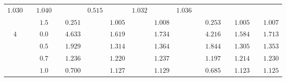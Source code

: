 \documentclass[twoside]{article}
\begin{document}
\begin{table}[h]
\begin{center}
\begin{tabular}{ | c | c c | c c c c c c | c c c c c c c | }
\multicolumn{1}{c}{$ 1.030 $} & 
\multicolumn{1}{c}{} & 
\multicolumn{1}{c}{$ 1.040 $} &
\multicolumn{2}{c}{} & 
\multicolumn{1}{c}{$ 0.515 $} &   
\multicolumn{1}{c}{} & 
\multicolumn{1}{c}{$ 1.032 $} & 
\multicolumn{1}{c}{} & 
\multicolumn{1}{c|}{$ 1.036 $} 
\\   
\multicolumn{1}{|c}{} & 
\multicolumn{1}{c}{} & 
\multicolumn{1}{c}{$ 1.5 $} & 
\multicolumn{1}{c}{} & 
\multicolumn{1}{c}{$ 0.251 $} &   
\multicolumn{1}{c}{} & 
\multicolumn{1}{c}{$ 1.005 $} & 
\multicolumn{1}{c}{} & 
\multicolumn{1}{c}{$ 1.008 $} &
\multicolumn{2}{c}{} & 
\multicolumn{1}{c}{$ 0.253 $} &   
\multicolumn{1}{c}{} & 
\multicolumn{1}{c}{$ 1.005 $} & 
\multicolumn{1}{c}{} & 
\multicolumn{1}{c|}{$ 1.007 $} 
\\   
\hline 
\multicolumn{1}{|c}{$ 4 $} & 
\multicolumn{1}{c}{} & 
\multicolumn{1}{c}{$ 0.0 $} & 
\multicolumn{1}{c}{} & 
\multicolumn{1}{c}{$ 4.633 $} &   
\multicolumn{1}{c}{} & 
\multicolumn{1}{c}{$ 1.619 $} & 
\multicolumn{1}{c}{} & 
\multicolumn{1}{c}{$ 1.734 $} &
\multicolumn{2}{c}{} & 
\multicolumn{1}{c}{$ 4.216 $} &   
\multicolumn{1}{c}{} & 
\multicolumn{1}{c}{$ 1.584 $} & 
\multicolumn{1}{c}{} & 
\multicolumn{1}{c|}{$ 1.713 $} 
\\  
\multicolumn{1}{|c}{} & 
\multicolumn{1}{c}{} & 
\multicolumn{1}{c}{$ 0.5 $} & 
\multicolumn{1}{c}{} & 
\multicolumn{1}{c}{$ 1.929 $} &   
\multicolumn{1}{c}{} & 
\multicolumn{1}{c}{$ 1.314 $} & 
\multicolumn{1}{c}{} & 
\multicolumn{1}{c}{$ 1.364 $} &
\multicolumn{2}{c}{} & 
\multicolumn{1}{c}{$ 1.844 $} &   
\multicolumn{1}{c}{} & 
\multicolumn{1}{c}{$ 1.305 $} & 
\multicolumn{1}{c}{} & 
\multicolumn{1}{c|}{$ 1.353 $} 
\\    
\multicolumn{1}{|c}{} & 
\multicolumn{1}{c}{} & 
\multicolumn{1}{c}{$ 0.7 $} & 
\multicolumn{1}{c}{} & 
\multicolumn{1}{c}{$ 1.236 $} &   
\multicolumn{1}{c}{} & 
\multicolumn{1}{c}{$ 1.220 $} & 
\multicolumn{1}{c}{} & 
\multicolumn{1}{c}{$ 1.237 $} &
\multicolumn{2}{c}{} & 
\multicolumn{1}{c}{$ 1.197 $} &   
\multicolumn{1}{c}{} & 
\multicolumn{1}{c}{$ 1.214 $} & 
\multicolumn{1}{c}{} & 
\multicolumn{1}{c|}{$ 1.230 $} 
\\  
\multicolumn{1}{|c}{} & 
\multicolumn{1}{c}{} & 
\multicolumn{1}{c}{$ 1.0 $} & 
\multicolumn{1}{c}{} & 
\multicolumn{1}{c}{$ 0.700 $} &   
\multicolumn{1}{c}{} & 
\multicolumn{1}{c}{$ 1.127 $} & 
\multicolumn{1}{c}{} & 
\multicolumn{1}{c}{$ 1.129 $} &
\multicolumn{2}{c}{} & 
\multicolumn{1}{c}{$ 0.685 $} &   
\multicolumn{1}{c}{} & 
\multicolumn{1}{c}{$ 1.123 $} & 
\multicolumn{1}{c}{} & 
\multicolumn{1}{c|}{$ 1.125 $} 

\end{tabular}
\end{center}
\end{table}
\end{document}
